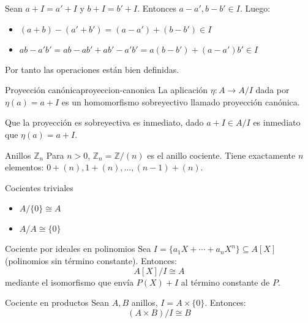 \begin{proofbox}
    Sean \(a + I = a' + I\) y \(b + I = b' + I\). Entonces \(a - a', b - b' \in I\). Luego:
    \begin{itemize}
        \item \((a + b) - (a' + b') = (a - a') + (b - b') \in I\)
        \item \(ab - a'b' = ab - ab' + ab' - a'b' = a(b - b') + (a - a')b' \in I\)
    \end{itemize}
    Por tanto las operaciones están bien definidas.
\end{proofbox}

\begin{definition}{Proyección canónica}{proyeccion-canonica}
    La aplicación \(\eta: A \to A/I\) dada por \(\eta(a) = a + I\) es un homomorfismo sobreyectivo llamado {proyección canónica}.
\end{definition}

\begin{proofbox}
    Que la proyección es sobreyectiva es inmediato, dado $a + I \in A/I$ es inmediato que $\eta(a) = a + I$.
\end{proofbox}

\begin{example}{Anillos \(\mathbb{Z}_n\)}{}
    Para \(n > 0\), \(\mathbb{Z}_n = \mathbb{Z}/(n)\) es el anillo cociente. Tiene exactamente \(n\) elementos: \(0 + (n), 1 + (n), \ldots, (n-1) + (n)\).
\end{example}

\begin{example}{Cocientes triviales}{}
    \begin{itemize}
        \item \(A/\{0\} \cong A\)
        \item \(A/A \cong \{0\}\)
    \end{itemize}
\end{example}

\begin{example}{Cociente por ideales en polinomios}{}
    Sea \(I = \{a_1X + \cdots + a_nX^n\} \subseteq A[X]\) (polinomios sin término constante). Entonces:
    \[
    A[X]/I \cong A
    \]
    mediante el isomorfismo que envía \(P(X) + I\) al término constante de \(P\).
\end{example}

\begin{example}{Cociente en productos}{}
    Sean \(A, B\) anillos, \(I = A \times \{0\}\). Entonces:
    \[
    (A \times B)/I \cong B
    \]
\end{example}

